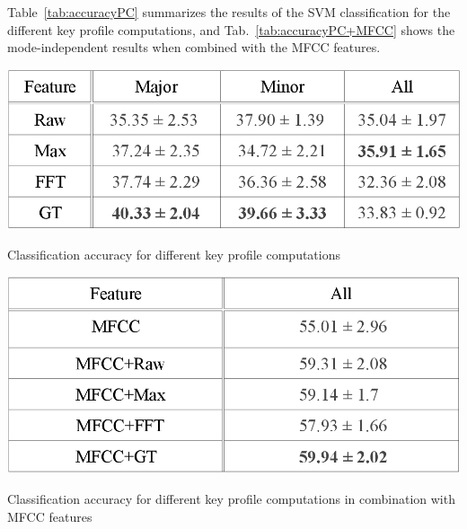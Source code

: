 \documentclass{article}
\begin{document}
Table~\ref{tab:accuracyPC} summarizes the results of the SVM classification for the different key profile computations, and Tab.~\ref{tab:accuracyPC+MFCC} shows the mode-independent results when combined with the MFCC features.
\begin{table}[tb]
    \includegraphics[scale=.4]{graph/accuracyPC}
	\caption{Classification accuracy for different key profile computations}
	\label{tab:accuracyPC}
\end{table}
\begin{table}[tb]
    \includegraphics[scale=.4]{graph/accuracyPC+MFCC}
	\caption{Classification accuracy for different key profile computations in combination with MFCC features}
	\label{tab:accuracyPC+MFCC}
\end{table}
\end{document}
